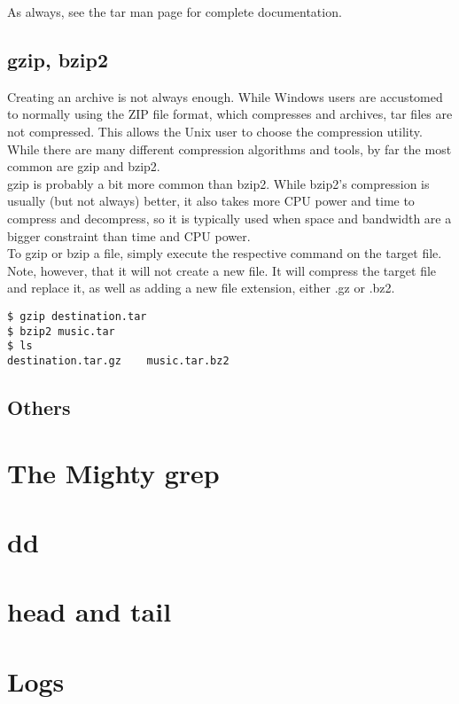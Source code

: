 As always, see the tar man page for complete documentation.

\subsection{gzip, bzip2}

Creating an archive is not always enough.  While Windows users are accustomed to normally using the ZIP file format, which compresses and archives, tar files are not compressed.  This allows the Unix user to choose the compression utility.  While there are many different compression algorithms and tools, by far the most common are gzip and bzip2.\\

gzip is probably a bit more common than bzip2.  While bzip2's compression is usually (but not always) better, it also takes more CPU power and time to compress and decompress, so it is typically used when space and bandwidth are a bigger constraint than time and CPU power.\\

To gzip or bzip a file, simply execute the respective command on the target file.  Note, however, that it will not create a new file. It will compress the target file and replace it, as well as adding a new file extension, either .gz or .bz2.\\

\begin{verbatim}
$ gzip destination.tar
$ bzip2 music.tar
$ ls 
destination.tar.gz    music.tar.bz2
\end{verbatim}

\subsection{Others}

\section{The Mighty grep}

\section{dd}

\section{head and tail}

\section{Logs}

